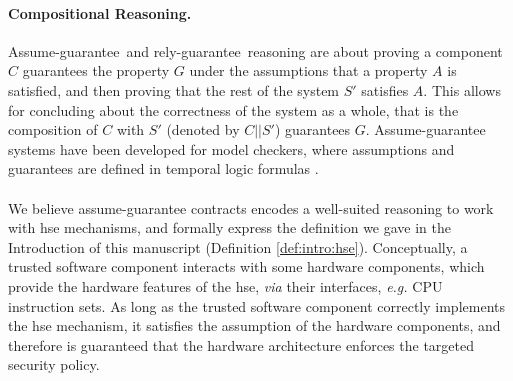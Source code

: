 \paragraph{Compositional Reasoning.}
%
Assume-guarantee\,\cite{pnueli1985ag} and
rely-guarantee\,\cite{jones1983tentative} reasoning are about proving a
component \( C \) guarantees the property \( G \) under the assumptions that a
property \( A \) is satisfied, and then proving that the rest of the system
\( S' \) satisfies \( A \).
%
This allows for concluding about the correctness of the system as a whole, that
is the composition of \( C \) with \( S' \) (denoted by \( C || S' \))
guarantees \( G \).
%
Assume-guarantee systems have been developed for model checkers, where
assumptions and guarantees are defined in temporal logic formulas .


\paragraph*{}
%
We believe assume-guarantee contracts encodes a well-suited reasoning to work
with \ac{hse} mechanisms, and formally express the definition we gave in the
Introduction of this manuscript (Definition \ref{def:intro:hse}).
%
Conceptually, a trusted software component interacts with some hardware
components, which provide the hardware features of the \ac{hse}, \emph{via}
their interfaces, \emph{e.g.} CPU instruction sets.
%
As long as the trusted software component correctly implements the \ac{hse}
mechanism, it satisfies the assumption of the hardware components, and therefore
is guaranteed that the hardware architecture enforces the targeted security
policy.
%

